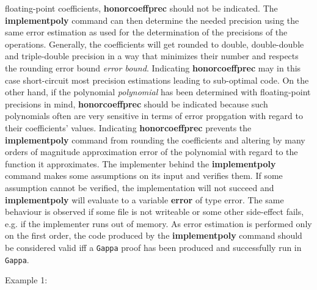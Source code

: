 \begin{itemize}
   floating-point coefficients, \textbf{honorcoeffprec} should not be
   indicated. The \textbf{implementpoly} command can then determine the needed
   precision using the same error estimation as used for the
   determination of the precisions of the operations. Generally, the
   coefficients will get rounded to double, double-double and
   triple-double precision in a way that minimizes their number and
   respects the rounding error bound \emph{error bound}.  Indicating
   \textbf{honorcoeffprec} may in this case short-circuit most precision
   estimations leading to sub-optimal code. On the other hand, if the
   polynomial \emph{polynomial} has been determined with floating-point
   precisions in mind, \textbf{honorcoeffprec} should be indicated because such
   polynomials often are very sensitive in terms of error propgation with
   regard to their coefficients' values. Indicating \textbf{honorcoeffprec}
   prevents the \textbf{implementpoly} command from rounding the coefficients and
   altering by many orders of magnitude approximation error of the
   polynomial with regard to the function it approximates.
   The implementer behind the \textbf{implementpoly} command makes some assumptions on
   its input and verifies them. If some assumption cannot be verified,
   the implementation will not succeed and \textbf{implementpoly} will evaluate to a
   variable \textbf{error} of type \textsf{error}. The same behaviour is observed if
   some file is not writeable or some other side-effect fails, e.g. if
   the implementer runs out of memory.
   As error estimation is performed only on the first order, the code
   produced by the \textbf{implementpoly} command should be considered valid iff a
   \texttt{Gappa} proof has been produced and successfully run
   in \texttt{Gappa}.
\end{itemize}
\noindent Example 1: 
